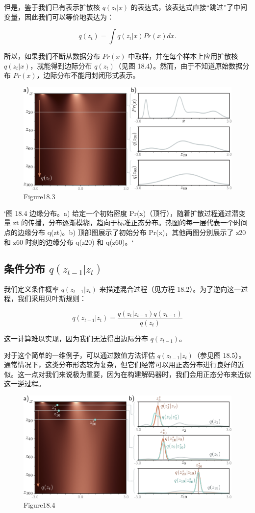 但是，鉴于我们已有表示扩散核 \(q(z_t|x)\) 的表达式，该表达式直接“跳过”了中间变量，因此我们可以等价地表达为：

\begin{equation}
q(z_t) = \int q(z_t|x) Pr(x)dx. 
\end{equation}

所以，如果我们不断从数据分布 \(Pr(x)\) 中取样，并在每个样本上应用扩散核 \(q(z_t|x)\)，就能得到边际分布 \(q(z_t)\)（见图 18.4）。然而，由于不知道原始数据分布 \(Pr(x)\)，边际分布不能用封闭形式表示。

\begin{figure}[ht!]
\centering
\includegraphics[width=0.7\linewidth]{png/chapter18/DiffusionDensity.png}
\caption{Figure18.3}
\end{figure}

`图 18.4 边缘分布。a) 给定一个初始密度 Pr(x)（顶行），随着扩散过程通过潜变量 zt 的传播，分布逐渐模糊，趋向于标准正态分布。热图的每一层代表一个时间点的边缘分布 q(zt)。b) 顶部图展示了初始分布 Pr(x)，其他两图分别展示了 z20 和 z60 时刻的边缘分布 q(z20) 和 q(z60)。`

\subsection{条件分布 \(q(z_{t-1}|z_t)\)}
我们定义条件概率 \(q(z_{t-1}|z_t)\) 来描述混合过程（见方程 18.2）。为了逆向这一过程，我们采用贝叶斯规则：

\begin{equation}
q(z_{t-1}|z_t) = \frac{q(z_t|z_{t-1})q(z_{t-1})}{q(z_t)} 
\end{equation}

这一计算难以实现，因为我们无法得出边际分布 \(q(z_{t-1})\)。

对于这个简单的一维例子，可以通过数值方法评估 \(q(z_{t-1}|z_t)\)（参见图 18.5）。通常情况下，这类分布形态较为复杂，但它们经常可以用正态分布进行良好的近似。这一点对我们来说极为重要，因为在构建解码器时，我们会用正态分布来近似这一逆过程。

\begin{figure}[ht!]
\centering
\includegraphics[width=0.7\linewidth]{png/chapter18/DiffusionReverse.png}
\caption{Figure18.4}
\end{figure}

